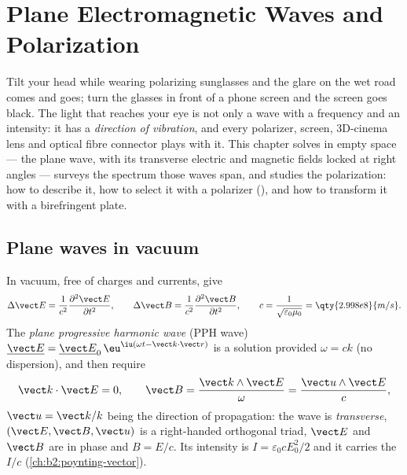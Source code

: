 \chapter{Plane Electromagnetic Waves and Polarization}\label{ch:b2:plane-waves-polarization}

Tilt your head while wearing polarizing sunglasses and the glare on the
wet road comes and goes; turn the glasses in front of a phone screen
and the screen goes black. The light that reaches your eye is not only
a wave with a frequency and an intensity: it has a \emph{direction of
vibration}, and every polarizer, screen, 3D-cinema lens and optical
fibre connector plays with it. This chapter solves 
in empty space --- the plane wave, with its transverse electric and
magnetic fields locked at right angles --- surveys the spectrum those
waves span, and studies the polarization: how to describe it, how to
select it with a polarizer (), and how to transform it with
a birefringent plate.

\section{Plane waves in vacuum}

\begin{theorem}\label{thm:b2:plane-waves-polarization:wave}
In vacuum, free of charges and currents,  give
\[
\Delta\vect E = \frac1{c^2}\frac{\partial^2\vect E}{\partial t^2} , \qquad
\Delta\vect B = \frac1{c^2}\frac{\partial^2\vect B}{\partial t^2} , \qquad
c = \frac1{\sqrt{\varepsilon_0\mu_0}} = \qty{2.998e8}{m/s} .
\]
The \emph{plane progressive harmonic wave} (PPH wave) $\underline{\vect E} =
\underline{\vect E}_0\,\eu^{\iu(\omega t - \vect k\cdot\vect r)}$ is a solution provided
$\omega = ck$ (no dispersion), and  then require
\[
\vect k\cdot\vect E = 0 , \qquad
\vect B = \frac{\vect k\wedge\vect E}\omega = \frac{\vect u\wedge\vect E}c ,
\]
$\vect u = \vect k/k$ being the direction of propagation: the wave is
\emph{transverse}, $(\vect E, \vect B, \vect u)$ is a right-handed orthogonal
triad, $\vect E$ and $\vect B$ are in phase and $B = E/c$. Its intensity is
$I = \varepsilon_0cE_0^2/2$ and it carries the  $I/c$
(\cref{ch:b2:poynting-vector}).
\end{theorem}

